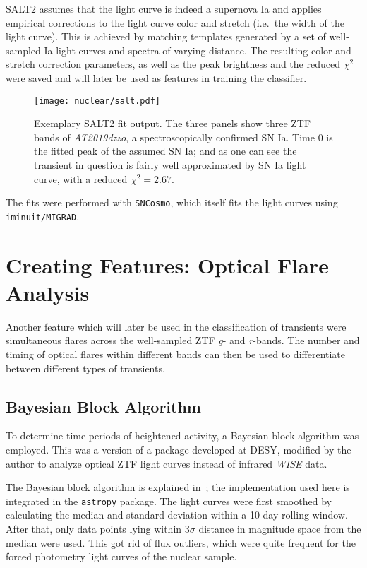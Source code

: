 SALT2 assumes that the light curve is indeed a supernova Ia and applies empirical corrections to the light curve color and stretch (i.e.~the width of the light curve). This is achieved by matching templates generated by a set of well-sampled Ia light curves and spectra of varying distance. The resulting color and stretch correction parameters, as well as the peak brightness and the reduced $\chi^2$ were saved and will later be used as features in training the classifier.

\begin{figure}[H]
  \texttt{[image: nuclear/salt.pdf]}
  \caption[SALT2 Fit]{Exemplary SALT2 fit output. The three panels show three ZTF bands of \textit{AT2019dzzo}, a spectroscopically confirmed SN Ia. Time 0 is the fitted peak of the assumed SN Ia; and as one can see the transient in question is fairly well approximated by SN Ia light curve, with a reduced  $\chi^2=2.67$.}
\end{figure}

The fits were performed with \texttt{SNCosmo}, which itself fits the light curves using \texttt{iminuit/MIGRAD}.

\section{Creating Features: Optical Flare Analysis}\label{bayesian_blocks}
Another feature which will later be used in the classification of transients were simultaneous flares across the well-sampled ZTF \textit{g}- and \textit{r}-bands. The number and timing of optical flares within different bands can then be used to differentiate between different types of transients.

\subsection{Bayesian Block Algorithm}\label{bayesian_block}
To determine time periods of heightened activity, a Bayesian block algorithm was employed. This was a version of a package developed at DESY, modified by the author to analyze optical ZTF light curves instead of infrared \textit{WISE} data.

The Bayesian block algorithm is explained in~; the implementation used here is integrated in the \texttt{astropy} package. The light curves were first smoothed by calculating the median and standard deviation within a 10-day rolling window. After that, only data points lying within $3 \sigma$ distance in magnitude space from the median were used. This got rid of flux outliers, which were quite frequent for the forced photometry light curves of the nuclear sample.

